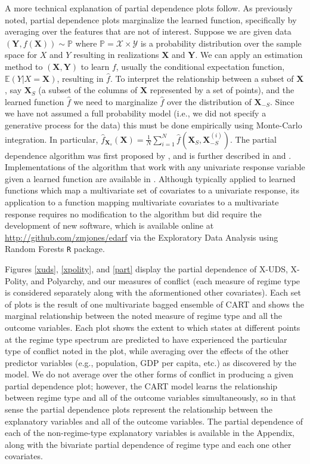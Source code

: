 \documentclass[titlepage, onecolumn,12pt]{article}
\begin{document}
A more technical explanation of partial dependence plots follow. As previously noted, partial dependence plots marginalize the learned function, specifically by averaging over the features that are not of interest. Suppose we are given data $(\mathbf{Y}, f(\mathbf{X})) \sim \mathbb{P}$ where $\mathbb{P} = \mathcal{X} \times \mathcal{Y}$ is a probability distribution over the sample space for $X$ and $Y$ resulting in realizations $\mathbf{X}$ and $\mathbf{Y}$. We can apply an estimation method to $(\mathbf{X}, \mathbf{Y})$ to learn $f$, usually the conditional expectation function, $\mathbb{E}(Y | X = \mathbf{X})$, resulting in $\hat{f}$. To interpret the relationship between a subset of $\mathbf{X}$, say $\mathbf{X}_S$ (a subset of the columns of $\mathbf{X}$ represented by a set of points), and the learned function $\hat{f}$ we need to marginalize $\hat{f}$ over the distribution of $\mathbf{X}_{-S}$. Since we have not assumed a full probability model (i.e., we did not specify a generative process for the data) this must be done empirically using Monte-Carlo integration. In particular, $\hat{f}_{\mathbf{X}_s}(\mathbf{X}) = \frac{1}{N} \sum_{i = 1}^N \hat{f}(\mathbf{X}_S, \mathbf{X}^{(i)}_{-S})$. The partial dependence algorithm was first proposed by \citet{friedman2001greedy}, and is further described in \citet{friedman2001elements} and \citet{jones2015rfss}. Implementations of the algorithm that work with any univariate response variable given a learned function are available in \citet{bischl2015package}. Although typically applied to learned functions which map a multivariate set of covariates to a univariate response, its application to a function mapping multivariate covariates to a multivariate response requires no modification to the algorithm but did require the development of new software, which is available online at \url{http://github.com/zmjones/edarf} via the Exploratory Data Analysis using Random Forests \texttt{R} package.

Figures \ref{xuds}, \ref{xpolity}, and \ref{part} display the partial dependence of X-UDS, X-Polity, and Polyarchy, and our measures of conflict (each measure of regime type is considered separately along with the aformentioned other covariates). Each set of plots is the result of one multivariate bagged ensemble of CART and shows the marginal relationship between the noted measure of regime type and all the outcome variables. Each plot shows the extent to which states at different points at the regime type spectrum are predicted to have experienced the particular type of conflict noted in the plot, while averaging over the effects of the other predictor variables (e.g., population, GDP per capita, etc.) as discovered by the model. We do not average over the other forms of conflict in producing a given partial dependence plot; however, the CART model learns the relationship between regime type and all of the outcome variables simultaneously, so in that sense the partial dependence plots represent the relationship between the explanatory variables and all of the outcome variables. The partial dependence of each of the non-regime-type explanatory variables is available in the Appendix, along with the bivariate partial dependence of regime type and each one other covariates.
\end{document}
